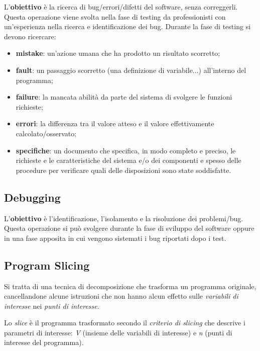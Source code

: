 \documentclass{article}
\begin{document}
            L'\textbf{obiettivo} è la ricerca di bug/errori/difetti del software, senza correggerli. Questa operazione viene svolta nella fase di testing da professionisti con un'esperienza nella ricerca e identificazione dei bug.
            \newline
            \newline
            \noindent
            Durante la fase di testing si devono ricercare:
            \begin{itemize}
                \item \textbf{mistake}: un'azione umana che ha prodotto un risultato scorretto;
                \item \textbf{fault}: un passaggio scorretto (una definizione di variabile...) all'interno del programma;
                \item \textbf{failure}: la mancata abilità da parte del sistema di svolgere le funzioni richieste;
                \item \textbf{errori}: la differenza tra il valore atteso e il valore effettivamente calcolato/osservato;
                \item \textbf{specifiche}: un documento che specifica, in modo completo e preciso, le richieste e le caratteristiche del sistema e/o dei componenti e spesso delle procedure per verificare quali delle disposizioni sono state soddisfatte.
            \end{itemize}

        \subsection{Debugging}
            L'\textbf{obiettivo} è l'identificazione, l'isolamento e la risoluzione dei problemi/bug. Questa operazione si può svolgere durante la fase di sviluppo del software oppure in una fase apposita in cui vengono sistemati i bug riportati dopo i test.

        \subsection{Program Slicing}
            Si tratta di una tecnica di decomposizione che trasforma un programma originale, cancellandone alcune istruzioni che non hanno alcun effetto sulle \textit{variabili di interesse} nei \textit{punti di interesse}.

            Lo \textit{slice} è il programma trasformato secondo il \textit{criterio di slicing} che descrive i parametri di interesse: \textit{V} (insieme delle variabili di interesse) e \textit{n} (punti di interesse del programma).
\end{document}
